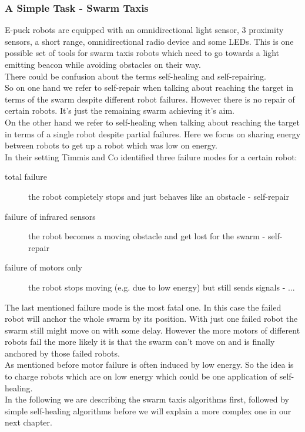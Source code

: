 \documentclass[
	a4paper,
	article,
	pagesize,
	pdftex,
	12pt,
	english,
	fleqn,
	final,
	]{scrartcl}
\begin{document}
\subsubsection{A Simple Task - Swarm Taxis}
E-puck robots are equipped with an omnidirectional light sensor, 3 proximity sensors, a short range, omnidirectional radio device and some LEDs.
This is one possible set of tools for swarm taxis robots which need to go towards a light emitting beacon while avoiding obstacles on their way.\\

There could be confusion about the terms self-healing and self-repairing.\\
So on one hand we refer to self-repair when talking about reaching the target
in terms of the swarm despite different robot failures. However there is no repair of certain robots. It's just the remaining swarm achieving it's aim.\\
On the other hand we refer to self-healing when talking about reaching the target
in terms of a single robot despite partial failures. 
Here we focus on sharing energy between robots to get up a robot which was low on energy.\\

In their setting Timmis and Co identified three failure modes for a certain robot:
\begin{description}
	\item[total failure] the robot completely stops and just behaves like an obstacle - self-repair
	\item[failure of infrared sensors] the robot becomes a moving obstacle and get lost for the swarm - self-repair
	\item[failure of motors only] the robot stops moving (e.g. due to low energy) but still sends signals - ...
\end{description} 

The last mentioned failure mode is the most fatal one. In this case the failed robot will anchor the whole swarm by its position. With just one failed robot the swarm still might move on with some delay. However the more motors of different robots fail the more likely it is that the swarm can't move on and is finally anchored by those failed robots.\\

As mentioned before motor failure is often induced by low energy. So the idea is to charge robots which are on low energy which could be one application of self-healing.\\
In the following we are describing the swarm taxis algorithms first, followed by simple self-healing algorithms before we will explain a more complex one in our next chapter.
\end{document}
